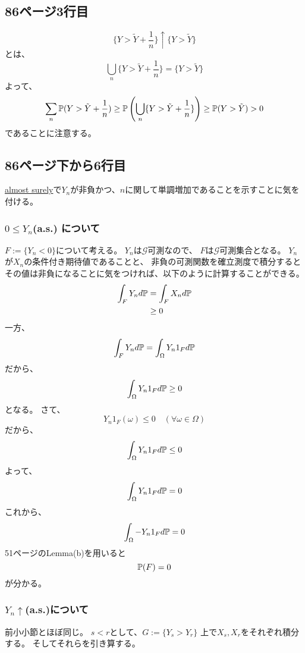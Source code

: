     \subsection{86ページ3行目}
      \[
        \{ Y > \tilde{Y} + \frac{1}{n} \} \uparrow
        \{ Y > \tilde{Y}\}
      \]
      とは、
      \[
        \bigcup_{n}\{ Y > \tilde{Y} + \frac{1}{n} \} =
        \{ Y > \tilde{Y}\}
      \]
      よって、
      \[
        \sum_n {\mathbb{P}}(Y > \tilde{Y} + \frac{1}{n})
        \ge
        {\mathbb{P}} \left(\bigcup_{n}\{ Y > \tilde{Y} + \frac{1}{n} \} \right)
        \ge
        {\mathbb{P}}(Y > \tilde{Y})
        > 0
      \]
      であることに注意する。

    \subsection{86ページ下から6行目}
      \underline{almost surely}で$Y_n$が非負かつ、$n$に関して単調増加であることを示すことに気を付ける。
      \subsubsection{$0 \leq Y_n$(a.s.) について}
        $F := \{ Y_n < 0 \}$について考える。
        $Y_n$は$\mathcal{G}$可測なので、
        $F$は$\mathcal{G}$可測集合となる。
        $Y_n$が$X_n$の条件付き期待値であることと、
        非負の可測関数を確立測度で積分するとその値は非負になることに気をつければ、以下のように計算することができる。
        \begin{align*}
          \int_F Y_n d{\mathbb{P}} &= \int_F X_n d{\mathbb{P}} \\
          &\ge 0
        \end{align*}
        一方、
        \[
          \int_F Y_n d{\mathbb{P}} = \int_{\Omega} Y_n 1_F d{\mathbb{P}}
        \]
        だから、
        \[
          \int_{\Omega} Y_n 1_F d{\mathbb{P}} \ge 0
        \]
        となる。
        さて、
        \[
          Y_n 1_F(\omega) \leq 0 \quad (\forall \omega \in \Omega)
        \]
        だから、
        \[
          \int_{\Omega} Y_n 1_F d{\mathbb{P}} \leq 0
        \]
        よって、
        \[
          \int_{\Omega} Y_n 1_F d{\mathbb{P}} = 0
        \]
        これから、
        \[
          \int_{\Omega} -Y_n 1_F d{\mathbb{P}} = 0
        \]
        51ページのLemma(b)を用いると
        \[
          {\mathbb{P}}(F) = 0
        \]
        が分かる。

      \subsubsection{$Y_n \uparrow$(a.s.)について}
        前小小節とほぼ同じ。
        $s < r$として、$G := \{ Y_s > Y_r \}$
        上で$X_s,X_r$をそれぞれ積分する。
        そしてそれらを引き算する。

